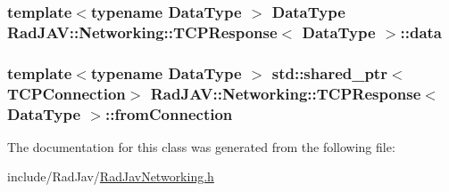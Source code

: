 \subsubsection[{\texorpdfstring{data}{data}}]{\setlength{\rightskip}{0pt plus 5cm}template$<$typename Data\+Type $>$ Data\+Type {\bf Rad\+J\+A\+V\+::\+Networking\+::\+T\+C\+P\+Response}$<$ Data\+Type $>$\+::data}\hypertarget{class_rad_j_a_v_1_1_networking_1_1_t_c_p_response_ae5bd39a2e169a0f19e16614c6f76de8d}{}\label{class_rad_j_a_v_1_1_networking_1_1_t_c_p_response_ae5bd39a2e169a0f19e16614c6f76de8d}
\subsubsection[{\texorpdfstring{from\+Connection}{fromConnection}}]{\setlength{\rightskip}{0pt plus 5cm}template$<$typename Data\+Type $>$ std\+::shared\+\_\+ptr$<${\bf T\+C\+P\+Connection}$>$ {\bf Rad\+J\+A\+V\+::\+Networking\+::\+T\+C\+P\+Response}$<$ Data\+Type $>$\+::from\+Connection}\hypertarget{class_rad_j_a_v_1_1_networking_1_1_t_c_p_response_a256974dab7fab1800d974135d8aa1f47}{}\label{class_rad_j_a_v_1_1_networking_1_1_t_c_p_response_a256974dab7fab1800d974135d8aa1f47}


The documentation for this class was generated from the following file\+:\begin{DoxyCompactItemize}
\item 
include/\+Rad\+Jav/\hyperlink{_rad_jav_networking_8h}{Rad\+Jav\+Networking.\+h}\end{DoxyCompactItemize}
